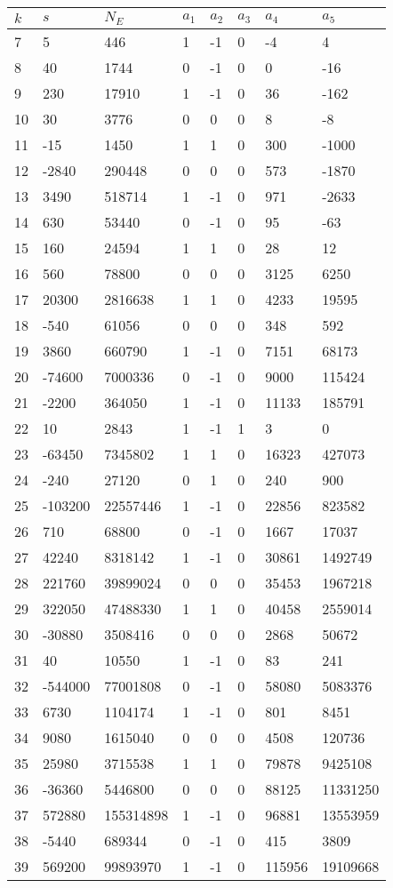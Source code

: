 \documentclass{amsart}
\begin{document}
\begin{longtable}{|l|l|l|lllll|}
\hline
$k$ & $s$ & $N_E$ & $a_1$ & $a_2$ & $a_3$ & $a_4$ & $a_5$\\
\hline
7&5&446&1&-1&0&-4&4\\
8&40&1744&0&-1&0&0&-16\\
9&230&17910&1&-1&0&36&-162\\
10&30&3776&0&0&0&8&-8\\
11&-15&1450&1&1&0&300&-1000\\
12&-2840&290448&0&0&0&573&-1870\\
13&3490&518714&1&-1&0&971&-2633\\
14&630&53440&0&-1&0&95&-63\\
15&160&24594&1&1&0&28&12\\
16&560&78800&0&0&0&3125&6250\\
17&20300&2816638&1&1&0&4233&19595\\
18&-540&61056&0&0&0&348&592\\
19&3860&660790&1&-1&0&7151&68173\\
20&-74600&7000336&0&-1&0&9000&115424\\
21&-2200&364050&1&-1&0&11133&185791\\
22&10&2843&1&-1&1&3&0\\
23&-63450&7345802&1&1&0&16323&427073\\
24&-240&27120&0&1&0&240&900\\
25&-103200&22557446&1&-1&0&22856&823582\\
26&710&68800&0&-1&0&1667&17037\\
27&42240&8318142&1&-1&0&30861&1492749\\
28&221760&39899024&0&0&0&35453&1967218\\
29&322050&47488330&1&1&0&40458&2559014\\
30&-30880&3508416&0&0&0&2868&50672\\
31&40&10550&1&-1&0&83&241\\
32&-544000&77001808&0&-1&0&58080&5083376\\
33&6730&1104174&1&-1&0&801&8451\\
34&9080&1615040&0&0&0&4508&120736\\
35&25980&3715538&1&1&0&79878&9425108\\
36&-36360&5446800&0&0&0&88125&11331250\\
37&572880&155314898&1&-1&0&96881&13553959\\
38&-5440&689344&0&-1&0&415&3809\\
39&569200&99893970&1&-1&0&115956&19109668\\

\end{longtable}
\end{document}
